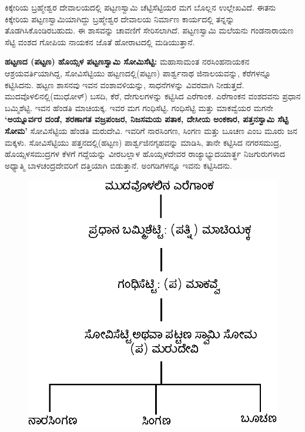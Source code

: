 ಕಿಕ್ಕೇರಿಯ ಬ್ರಹ್ಮೇಶ್ವರ ದೇವಾಲಯದಲ್ಲಿ ಪಟ್ಟಣಸ್ವಾಮಿ ಚೆಟ್ಟಿಸೆಟ್ಟಿಯರ ಮಗ ಬೊಲ್ಲನ ಉಲ್ಲೇಖವಿದೆ. ಈತನು ಕಿಕ್ಕೇರಿಯ ಪಟ್ಟಣಸ್ವಾಮಿಯಾಗಿದ್ದು ಬ್ರಹ್ಮೇಶ್ವರ ದೇವಾಲಯ ನಿರ್ಮಾಣ ಕಾರ್ಯದಲ್ಲಿ ತನ್ನನ್ನು ತೊಡಗಿಸಿಕೊಂಡಿರಬಹುದು. ಈ ಶಾಸವನ್ನು ಚಾವಣಿಗೆ ಸೇರಿಸಲಾಗಿದೆ. ಪಟ್ಟಣಸ್ವಾಮಿ ಮಲೆಯನು ಗಂಡನಾರಾಯಣ ಸೆಟ್ಟಿ ವಂಶದ ಗೋಪಿಯ ನಾಯಕನ ಜೊತೆ ಹೋರಾಟದಲ್ಲಿ ಮಡಿಯುತ್ತಾನೆ.

\textbf{ಹಟ್ಟಣದ (ಪಟ್ಟಣ) ಹೊಯ್ಸಳ ಪಟ್ಟಣಸ್ವಾಮಿ ಸೋಮಿಸೆಟ್ಟಿ: } ಮಹಾಸಾಮಂತ ನರಸಿಂಹನಾಯಕನ ಆಶ್ರಯವರ್ತಿ\-ಯಾಗಿದ್ದ, ಸೋವಿಸೆಟ್ಟಿಯು ಹಟ್ಟಣದಲ್ಲಿ(ಪಟ್ಟಣ) ಪಾರ್ಶ್ವನಾಥ ಜಿನಾಲಯವನ್ನು, ಕೆರೆಗಳನ್ನೂ ಕಟ್ಟಿಸಿದನು. ಹಟ್ಟಣ ಶಾಸನವು ಇವನ ವಂಶಾವಳಿಯನ್ನು, ಸಾಧನೆಗಳನ್ನು ವಿವರವಾಗಿ ನೀಡುತ್ತದೆ. ಮುದವೊಳಲಿನಲ್ಲಿ(ಮುಧೋಳ್​) ಬಸದಿ, ಕೆರೆ, ದೇಗುಲಗಳನ್ನು ಕಟ್ಟಿಸಿದ ಎರೆಗಾಂಕ. ಎರೆಗಾಂಕನ ವಂಶದವನು ಪ್ರಧಾನ ಬಮ್ಮಿಶೆಟ್ಟಿ. ಇವನ ಹೆಂಡತಿ ಮಾಚಿಯಕ್ಕ. ಇವರ ಮಗ ಗಂಧಿಸೆಟ್ಟಿ. ಗಂಧಿಸೆಟ್ಟಿ ಮತ್ತು ಮಾಕವ್ವೆಯರ ಮಗನೇ \textbf{‘ಅಯ್ನೂರ್ವರ ದಂಡೆ, ಶರಣಾಗತ ವಜ್ರಪಂಜರ, ನಿಜಸಮಯ ಪತಾಕ, ದೇಸೀಯ ಅಂಕಕಾರ, ಪತ್ತನಸ್ವಾಮಿ ಸೆಟ್ಟಿ ಸೋಮ’} ಸೋವಿಸೆಟ್ಟಿಯ ಹೆಂಡತಿ ಮರುದೇವಿ. ಇವರಿಗೆ ನಾರಸಿಂಗಣ, ಸಿಂಗಣ ಮತ್ತು ಬೂಚಣ ಎಂಬ ಮೂರು ಜನ ಮಕ್ಕಳು. ಸೋವಿಸೆಟ್ಟಿಯು ಪತ್ತನದಲ್ಲಿ(ಹಟ್ಟಣ) ಪಾರ್ಶ್ವಜಿನಗೃಹವನ್ನು ಮಾಡಿಸಿ, ತಾನೇ ಕಟ್ಟಿಸಿದ ನಗರಸಮುದ್ರ, ಹೊಯ್ಸಳಸಮುದ್ರಗಳ ಕೆಳಗೆ ಗದ್ದೆಯನ್ನು ವೀರಬಲ್ಲಾಳ ಹೊಯ್ಸಳದೇವರ ರಾಜ್ಯಾಭ್ಯುದಯಾರ್ತ್ಥ ನಿಜಗುರುಗಳಾದ ಅಧ್ಯಾತ್ಮಿ ಬಾಳಚಂದ್ರದೇವರಿಗೆ ದತ್ತಿಯಾಗಿ ಬಿಡುತ್ತಾನೆ. ಅಂಗಡಿಗಳನ್ನೂ ಇವನು ಕಟ್ಟಿಸಿದನು.

\begin{figure}[!h]
\includegraphics{images/chap8/chap8fig1.jpeg}
\end{figure}

